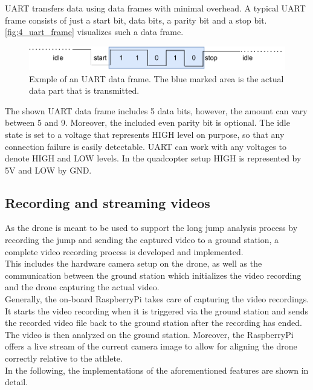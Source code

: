 \noindent UART transfers data using data frames with minimal overhead.
A typical UART frame consists of just a start bit, data bits, a parity bit and
a stop bit.
\autoref{fig:4_uart_frame} visualizes such a data frame. 
\begin{figure}[!h]
    \centering
    \includegraphics[scale=0.8]{uart_frame.pdf}
    \caption[UART data frame]{Exmple of an UART data frame. The blue marked
    area is the actual data part that is transmitted.}
    \label{fig:4_uart_frame}
\end{figure}
\FloatBarrier
\noindent The shown UART data frame includes 5 data bits, however, the amount
can vary between 5 and 9.
Moreover, the included even parity bit is optional.
The idle state is set to a voltage that represents HIGH level on purpose, so
that any connection failure is easily detectable.
UART can work with any voltages to denote HIGH and LOW levels.
In the quadcopter setup HIGH is represented by 5V and LOW by GND.

\subsection{Recording and streaming videos}\label{subsec:4_rec_stream_video}
As the drone is meant to be used to support the long jump analysis process by
recording the jump and sending the captured video to a ground station, a
complete video recording process is developed and implemented.\\
This includes the hardware camera setup on the drone, as well as the
communication between the ground station which initializes the video
recording and the drone capturing the actual video.\\
Generally, the on-board RaspberryPi takes care of capturing the video
recordings.
It starts the video recording when it is triggered via the ground station and
sends the recorded video file back to the ground station after the recording
has ended.
The video is then analyzed on the ground station.
Moreover, the RaspberryPi offers a live stream of the current camera image to
allow for aligning the drone correctly relative to the athlete.\\
In the following, the implementations of the aforementioned features are shown
in detail.

